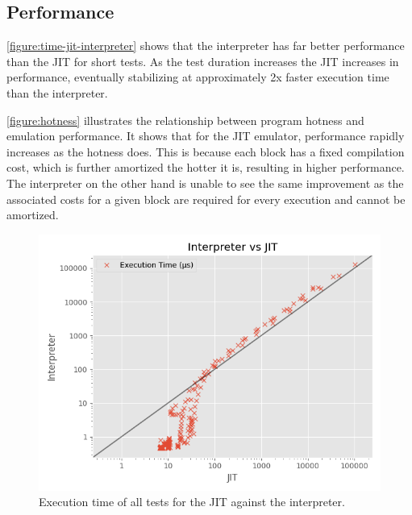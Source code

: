 \subsection{Performance}

\autoref{figure:time-jit-interpreter} shows that the interpreter has far better performance than the JIT for short tests. As the test duration increases the JIT increases in performance, eventually stabilizing at approximately 2x faster execution time than the interpreter.

\autoref{figure:hotness} illustrates the relationship between program hotness and emulation performance. It shows that for the JIT emulator, performance rapidly increases as the hotness does. This is because each block has a fixed compilation cost, which is further amortized the hotter it is, resulting in higher performance. The interpreter on the other hand is unable to see the same improvement as the associated costs for a given block are required for every execution and cannot be amortized.

\begin{figure}[h]
    \centering
    \includegraphics[scale=0.75]{output/graphs/scatter/time.png}
    \caption{Execution time of all tests for the JIT against the interpreter.}
    \label{figure:time-jit-interpreter}
\end{figure}

